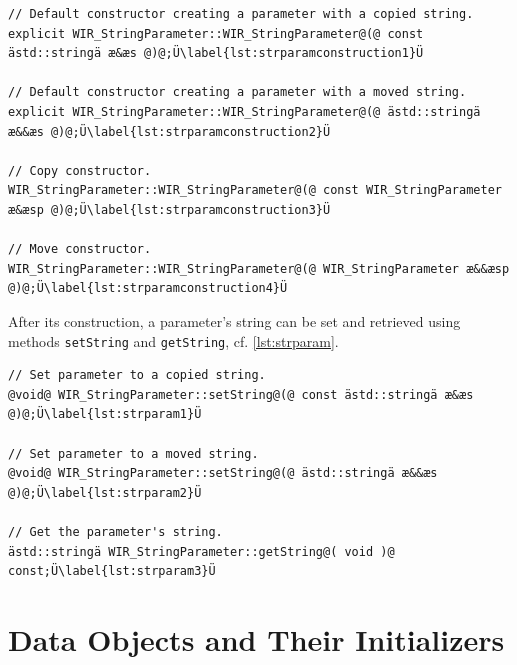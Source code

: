 \begin{lstlisting}[style=code,float=!t,caption={Constructors of Class \texttt{WIR\_StringParameter}},label=lst:strparamconstruction]
// Default constructor creating a parameter with a copied string.
explicit WIR_StringParameter::WIR_StringParameter@(@ const ästd::stringä æ&æs @)@;Ü\label{lst:strparamconstruction1}Ü

// Default constructor creating a parameter with a moved string.
explicit WIR_StringParameter::WIR_StringParameter@(@ ästd::stringä æ&&æs @)@;Ü\label{lst:strparamconstruction2}Ü

// Copy constructor.
WIR_StringParameter::WIR_StringParameter@(@ const WIR_StringParameter æ&æsp @)@;Ü\label{lst:strparamconstruction3}Ü

// Move constructor.
WIR_StringParameter::WIR_StringParameter@(@ WIR_StringParameter æ&&æsp @)@;Ü\label{lst:strparamconstruction4}Ü
\end{lstlisting}

After its construction, a parameter's string can be set and retrieved using methods \texttt{setString} and \texttt{getString}, cf. \cref{lst:strparam}.

\begin{lstlisting}[style=code,float=!ht,caption={String Handling of Class \texttt{WIR\_StringParameter}},label=lst:strparam]
// Set parameter to a copied string.
@void@ WIR_StringParameter::setString@(@ const ästd::stringä æ&æs @)@;Ü\label{lst:strparam1}Ü

// Set parameter to a moved string.
@void@ WIR_StringParameter::setString@(@ ästd::stringä æ&&æs @)@;Ü\label{lst:strparam2}Ü

// Get the parameter's string.
ästd::stringä WIR_StringParameter::getString@( void )@ const;Ü\label{lst:strparam3}Ü
\end{lstlisting}


\section{Data Objects and Their Initializers}
\label{sec:data}

